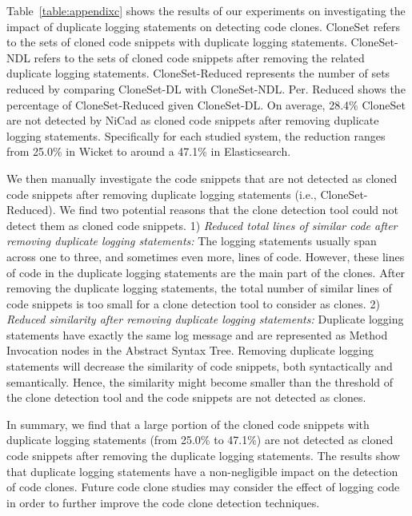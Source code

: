 Table~\ref{table:appendixc} shows the results of our experiments on investigating the impact of duplicate logging statements on detecting code clones. {\sf CloneSet} refers to the sets of cloned code snippets with duplicate logging statements. {\sf CloneSet-NDL} refers to the sets of cloned code snippets after removing the related duplicate logging statements. {\sf CloneSet-Reduced} represents the number of sets reduced by comparing {\sf CloneSet-DL} with {\sf CloneSet-NDL}. {\sf Per. Reduced} shows the percentage of {\sf CloneSet-Reduced} given {\sf CloneSet-DL}. On average, 28.4\% {\sf CloneSet} are not detected by NiCad as cloned code snippets after removing duplicate logging statements. Specifically for each studied system, the reduction ranges from 25.0\% in Wicket to around a 47.1\% in Elasticsearch. 


We then manually investigate the code snippets that are not detected as cloned code snippets after removing duplicate logging statements (i.e., {\sf CloneSet-Reduced}). We find two potential reasons that the clone detection tool could not detect them as cloned code snippets. 1) {\em Reduced total lines of similar code after removing duplicate logging statements:} The logging statements usually span across one to three, and sometimes even more, lines of code. However, these lines of code in the duplicate logging statements are the main part of the clones. After removing the duplicate logging statements, the total number of similar lines of code snippets is too small for a clone detection tool to consider as clones. 2) {\em Reduced similarity after removing duplicate logging statements:} Duplicate logging statements have exactly the same log message and are represented as Method Invocation nodes in the Abstract Syntax Tree. Removing duplicate logging statements will decrease the similarity of code snippets, both syntactically and semantically. Hence, the similarity might become smaller than the threshold of the clone detection tool and the code snippets are not detected as clones.

In summary, we find that a large portion of the cloned code snippets with duplicate logging statements (from 25.0\% to 47.1\%) are not detected as cloned code snippets after removing the duplicate logging statements. The results show that duplicate logging statements have a non-negligible impact on the detection of code clones. Future code clone studies may consider the effect of logging code in order to further improve the code clone detection techniques.

